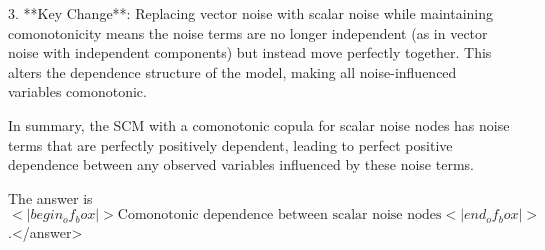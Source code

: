 3. **Key Change**: Replacing vector noise with scalar noise while maintaining comonotonicity means the noise terms are no longer independent (as in vector noise with independent components) but instead move perfectly together. This alters the dependence structure of the model, making all noise-influenced variables comonotonic.  

In summary, the SCM with a comonotonic copula for scalar noise nodes has noise terms that are perfectly positively dependent, leading to perfect positive dependence between any observed variables influenced by these noise terms.  

The answer is \(<|begin_of_box|>\text{Comonotonic dependence between scalar noise nodes}<|end_of_box|>\).</answer>